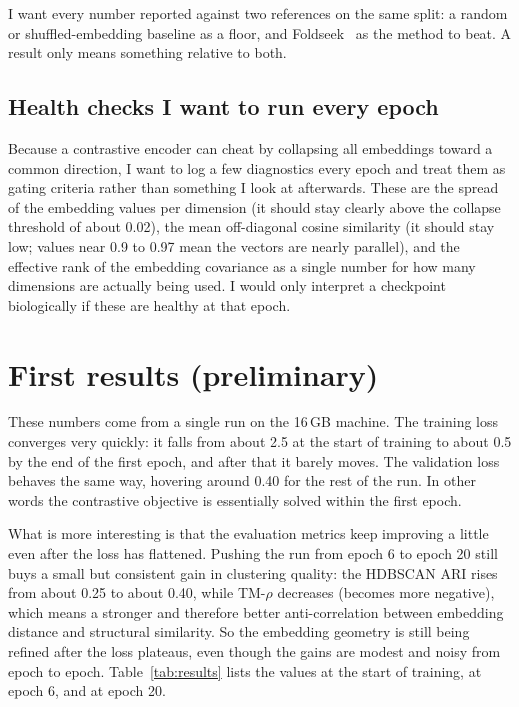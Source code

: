 \documentclass[11pt,a4paper]{article}
\theoremstyle{definition}
\begin{document}
I want every number reported against two references on the same split: a random
or shuffled-embedding baseline as a floor, and Foldseek~\cite{foldseek} as the
method to beat. A result only means something relative to both.

\subsection{Health checks I want to run every epoch}
\label{sec:health}

Because a contrastive encoder can cheat by collapsing all embeddings toward a
common direction, I want to log a few diagnostics every epoch and treat them as
gating criteria rather than something I look at afterwards. These are the spread
of the embedding values per dimension (it should stay clearly above the collapse
threshold of about 0.02), the mean off-diagonal cosine similarity (it should stay
low; values near 0.9 to 0.97 mean the vectors are nearly parallel), and the
effective rank of the embedding covariance as a single number for how many
dimensions are actually being used. I would only interpret a checkpoint
biologically if these are healthy at that epoch.

\section{First results (preliminary)}

These numbers come from a single run on the 16\,GB machine. The training loss
converges very quickly: it falls from about 2.5 at the start of training to about
0.5 by the end of the first epoch, and after that it barely moves. The validation
loss behaves the same way, hovering around 0.40 for the rest of the run. In other
words the contrastive objective is essentially solved within the first epoch.

What is more interesting is that the evaluation metrics keep improving a little
even after the loss has flattened. Pushing the run from epoch 6 to epoch 20 still
buys a small but consistent gain in clustering quality: the HDBSCAN ARI rises from
about 0.25 to about 0.40, while TM-$\rho$ decreases (becomes more negative), which
means a stronger and therefore better anti-correlation between embedding distance
and structural similarity. So the embedding geometry is still being refined after
the loss plateaus, even though the gains are modest and noisy from epoch to
epoch. Table~\ref{tab:results} lists the values at the start of training, at
epoch 6, and at epoch 20.
\end{document}
